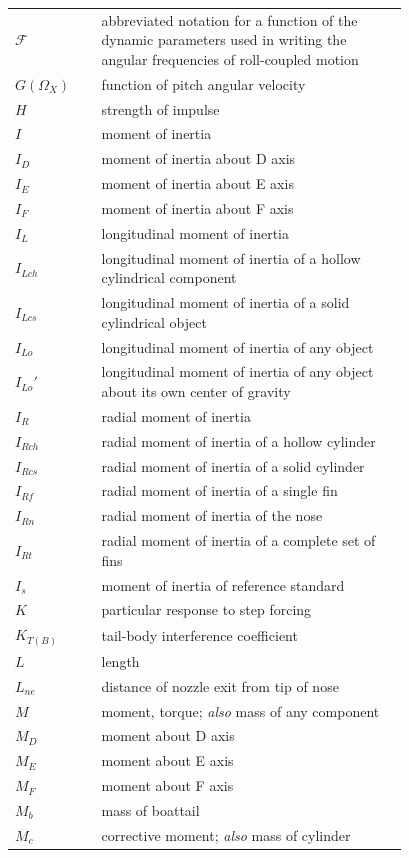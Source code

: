 \begin{longtable}{@{}l p{0.78\linewidth}@{}}
$\mathscr{F}$ & abbreviated notation for a function of the dynamic parameters used in writing the angular frequencies of roll-coupled motion \\
$G(\Omega_X)$ & function of pitch angular velocity \\
$H$ & strength of impulse \\
$I$ & moment of inertia \\
$I_D$ & moment of inertia about D axis \\
$I_E$ & moment of inertia about E axis \\
$I_F$ & moment of inertia about F axis \\
$I_L$ & longitudinal moment of inertia \\
$I_{Lch}$ & longitudinal moment of inertia of a hollow cylindrical component \\
$I_{Lcs}$ & longitudinal moment of inertia of a solid cylindrical object \\
$I_{Lo}$ & longitudinal moment of inertia of any object \\
$I_{Lo}'$ & longitudinal moment of inertia of any object about its own center of gravity \\
$I_R$ & radial moment of inertia \\
$I_{Rch}$ & radial moment of inertia of a hollow cylinder \\
$I_{Rcs}$ & radial moment of inertia of a solid cylinder \\
$I_{Rf}$ & radial moment of inertia of a single fin \\
$I_{Rn}$ & radial moment of inertia of the nose \\
$I_{Rt}$ & radial moment of inertia of a complete set of fins \\
$I_s$ & moment of inertia of reference standard \\
$K$ & particular response to step forcing \\
$K_{T(B)}$ & tail-body interference coefficient \\
$L$ & length \\
$L_{ne}$ & distance of nozzle exit from tip of nose \\
$M$ & moment, torque; \emph{also} mass of any component \\
$M_D$ & moment about D axis \\
$M_E$ & moment about E axis \\
$M_F$ & moment about F axis \\
$M_b$ & mass of boattail \\
$M_c$ & corrective moment; \emph{also} mass of cylinder \\

\end{longtable}
